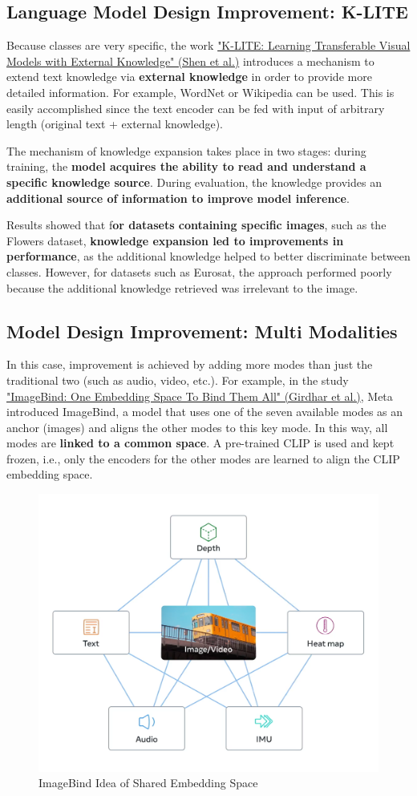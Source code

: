 \subsection{Language Model Design Improvement: K-LITE}

Because classes are very specific, the work \href{https://arxiv.org/pdf/2204.09222}{"K-LITE: Learning Transferable Visual Models with External Knowledge" (Shen et al.)} introduces a mechanism to extend text knowledge via \textbf{external knowledge} in order to provide more detailed information. For example, WordNet or Wikipedia can be used. This is easily accomplished since the text encoder can be fed with input of arbitrary length (original text + external knowledge).

The mechanism of knowledge expansion takes place in two stages: during training, the \textbf{model acquires the ability to read and understand a specific knowledge source}. During evaluation, the knowledge provides an \textbf{additional source of information to improve model inference}.

Results showed that f\textbf{or datasets containing specific images}, such as the Flowers dataset, \textbf{knowledge expansion led to improvements in performance}, as the additional knowledge helped to better discriminate between classes. However, for datasets such as Eurosat, the approach performed poorly because the additional knowledge retrieved was irrelevant to the image. 


\subsection{Model Design Improvement: Multi Modalities}

In this case, improvement is achieved by adding more modes than just the traditional two (such as audio, video, etc.). For example, in the study \href{https://arxiv.org/pdf/2305.05665}{"ImageBind: One Embedding Space To Bind Them All" (Girdhar et al.)}, Meta introduced ImageBind, a model that uses one of the seven available modes as an anchor (images) and aligns the other modes to this key mode. In this way, all modes are \textbf{linked to a common space}. A pre-trained CLIP is used and kept frozen, i.e., only the encoders for the other modes are learned to align the CLIP embedding space.

\begin{figure}[!htbp]
    \centering
    \includegraphics[width=0.6\linewidth]{tikz/chapter11 - ImageBind.png}
    \caption{ImageBind Idea of Shared Embedding Space}
\end{figure}

